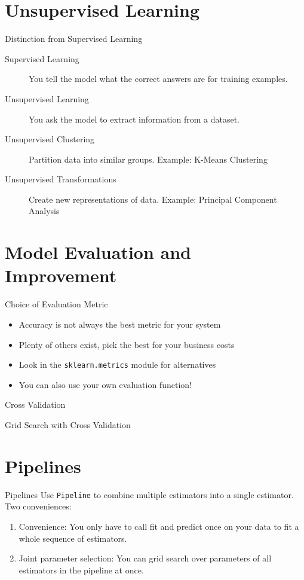 \documentclass{lug}
\begin{document}
\section{Unsupervised Learning}
\begin{frame}{Distinction from Supervised Learning}
  \begin{description}
    \item[Supervised Learning] You tell the model what the correct answers are for training examples.
    \item[Unsupervised Learning] You ask the model to extract information from a dataset.
    \item[Unsupervised Clustering] Partition data into similar groups. Example: K-Means Clustering
    \item[Unsupervised Transformations] Create new representations of data. Example: Principal Component Analysis
  \end{description}
\end{frame}

\section{Model Evaluation and Improvement}
\begin{frame}{Choice of Evaluation Metric}
  \begin{itemize}[<+->]
    \item Accuracy is not always the best metric for your system
    \item Plenty of others exist, pick the best for your business costs
    \item Look in the \texttt{sklearn.metrics} module for alternatives
    \item You can also use your own evaluation function!
  \end{itemize}
\end{frame}

\begin{frame}{Cross Validation}
\end{frame}

\begin{frame}{Grid Search with Cross Validation}
\end{frame}

\section{Pipelines}
\begin{frame}{Pipelines}
  Use \texttt{Pipeline} to combine multiple estimators into a single estimator. Two conveniences:
  \begin{enumerate}
    \item Convenience: You only have to call fit and predict once on your data to fit a whole sequence of estimators.
    \item Joint parameter selection: You can grid search over parameters of all estimators in the pipeline at once.
  \end{enumerate}
\end{frame}
\end{document}
